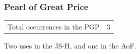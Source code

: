	\subsubsection{Pearl of Great Price} %
		\label{REMISSION-PGP}
	
		\begin{tabular}{ll}
			Total occurrences in the PGP & 3
		\end{tabular}
		
		Two uses in the JS-H, and one in the AoF.
		
		

	


	
	
	
